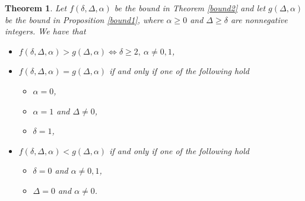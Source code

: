 \documentclass[a4paper,10pt]{article}
\theoremstyle{definition}
\theoremstyle{plain}
\newtheorem{theorem}{Theorem}
\begin{document}
 \begin{theorem}
   Let $f(\delta,\Delta,\alpha)$ be the bound in Theorem \ref{bound2}  and let $g(\Delta,\alpha)$ be the bound in  Proposition \ref{bound1}, where $\alpha\ge 0$ and $\Delta\ge\delta$ are nonnegative integers. We have that
\begin{itemize}
\item $f(\delta,\Delta,\alpha)> g(\Delta,\alpha) \iff \delta\ge2,\ \alpha\ne 0,1$,
\item $f(\delta,\Delta,\alpha)= g(\Delta,\alpha)$ if and only if one of the following hold
\begin{itemize}
    \item $\alpha = 0$,
    \item $\alpha= 1$ and $\Delta\ne 0$,
    \item $\delta=1$,
\end{itemize}
\item$f(\delta,\Delta,\alpha)< g(\Delta,\alpha)$  if and only if one of the following hold
\begin{itemize}
    \item $\delta=0$ and $\alpha\ne 0,1$,
    \item $\Delta=0$ and $\alpha\ne 0$.
\end{itemize}
     \end{itemize}
\end{theorem}
\end{document}
